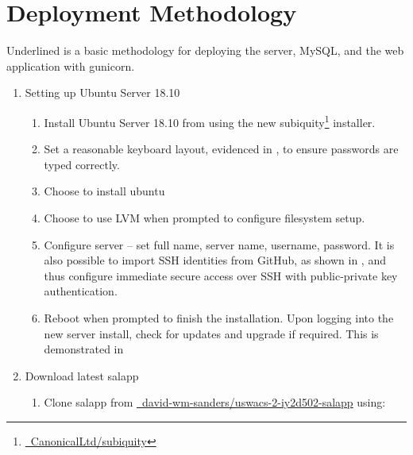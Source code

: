 \section{Deployment Methodology}
Underlined is a basic methodology for deploying the server, MySQL, and the web application with gunicorn.

\begin{enumerate}
  \item Setting up Ubuntu Server 18.10
    \begin{enumerate}[label=\roman*:]
      \item Install Ubuntu Server 18.10 from  using the new subiquity\footnote{\href{https://github.com/CanonicalLtd/subiquity}{\faGithub\ CanonicalLtd/subiquity}} installer. 
      \item Set a reasonable keyboard layout, evidenced in  , to ensure passwords are typed correctly.
      \item Choose to install ubuntu  
      \item Choose to use LVM when prompted to configure filesystem setup.  
      \item Configure server -- set full name, server name, username, password. It is also possible to import SSH identities from GitHub, as shown in , and thus configure immediate secure access over SSH with public-private key authentication.
      \item Reboot when prompted to finish the installation. Upon logging into the new server install, check for updates and upgrade if required. This is demonstrated in 
    \end{enumerate}
  \item Download latest salapp
    \begin{enumerate}[label=\roman*:]
      \item Clone salapp from \href{https://github.com/david-wm-sanders/uswacs-2-iy2d502-salapp}{\faGithub\ david-wm-sanders/uswacs-2-iy2d502-salapp} using:\\

\end{enumerate}
\end{enumerate}

